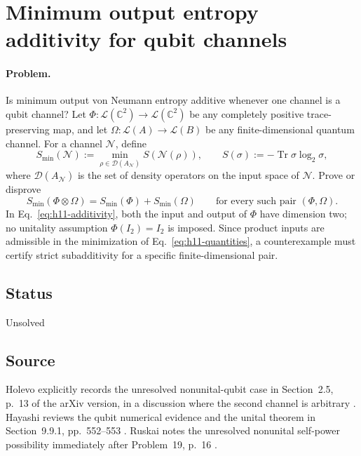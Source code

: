 \section{Minimum output entropy additivity for qubit channels}
\label{sec:op_eba8dda5ff69d0f2}

\paragraph{Problem.}
Is minimum output von Neumann entropy additive whenever one channel is a qubit channel? Let $\Phi:\mathcal L(\mathbb C^2)\to\mathcal L(\mathbb C^2)$ be any completely positive trace-preserving map, and let $\Omega:\mathcal L(A)\to\mathcal L(B)$ be any finite-dimensional quantum channel. For a channel $\mathcal N$, define
\begin{equation}
 S_{\min}(\mathcal N):=\min_{\rho\in\mathcal D(A_{\mathcal N})}S(\mathcal N(\rho)),\qquad S(\sigma):=-\operatorname{Tr}\sigma\log_2\sigma,
 \label{eq:h11-quantities}
\end{equation}
where $\mathcal D(A_{\mathcal N})$ is the set of density operators on the input space of $\mathcal N$. Prove or disprove
\begin{equation}
 S_{\min}(\Phi\otimes\Omega)=S_{\min}(\Phi)+S_{\min}(\Omega)\qquad\text{for every such pair }(\Phi,\Omega).
 \label{eq:h11-additivity}
\end{equation}
In Eq.~\eqref{eq:h11-additivity}, both the input and output of $\Phi$ have dimension two; no unitality assumption $\Phi(I_2)=I_2$ is imposed. Since product inputs are admissible in the minimization of Eq.~\eqref{eq:h11-quantities}, a counterexample must certify strict subadditivity for a specific finite-dimensional pair.

\subsection*{Status}

Unsolved

\subsection*{Source}

Holevo explicitly records the unresolved nonunital-qubit case in Section~2.5, p.~13 of the arXiv version, in a discussion where the second channel is arbitrary . Hayashi reviews the qubit numerical evidence and the unital theorem in Section~9.9.1, pp.~552--553 . Ruskai notes the unresolved nonunital self-power possibility immediately after Problem~19, p.~16 .

